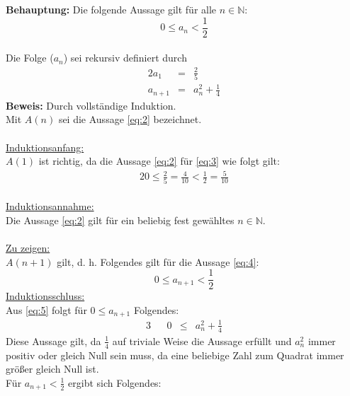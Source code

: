\documentclass[10pt,a4paper,oneside,ngerman,numbers=noenddot]{scrartcl}
\begin{document}
\section{} %
\textbf{Behauptung:} Die folgende Aussage gilt für alle $n \in \mathbb{N}$:\\
\begin{equation*}
0 \leq a_{n} < \frac{1}{2} \label{eq:2}\tag{2}
\end{equation*}\\
Die Folge ($a_{n}$) sei rekursiv definiert durch \\
\begin{alignat*}{2}
a_{1} &=& \frac{2}{5} \label{eq:3}\tag{3}\\
a_{n+1} &=& a_{n}^{2} + \frac{1}{4} \label{eq:4}\tag{4}
\end{alignat*} 
\textbf{Beweis:} Durch vollständige Induktion.\\
Mit $A(n)$ sei die Aussage \eqref{eq:2} bezeichnet.\\\\
\underline{Induktionsanfang:} \\
$A(1)$ ist richtig, da die Aussage \eqref{eq:2} für \eqref{eq:3} wie folgt gilt: 
\begin{alignat*}{2}
0 \leq \frac{2}{5} = \frac{4}{10} < \frac{1}{2} = \frac{5}{10} 
\end{alignat*}\\
\underline{Induktionsannahme:}\\
Die Aussage \eqref{eq:2} gilt für ein beliebig fest gewähltes $n \in \mathbb{N}$.\\\\
\underline{Zu zeigen:}\\
$A(n+1)$ gilt, d. h. Folgendes gilt für die Aussage \eqref{eq:4}:\\
\begin{equation*}
0 \leq a_{n+1} < \frac{1}{2} \label{eq:5}\tag{5}
\end{equation*}
\underline{Induktionsschluss:}\\
Aus \eqref{eq:5} folgt für $0 \leq a_{n+1}$ Folgendes:\\
\begin{alignat*}{3}
&& 0 &\leq & a_{n}^{2} + \frac{1}{4}
\end{alignat*}
Diese Aussage gilt, da $\frac{1}{4}$ auf triviale Weise die Aussage erfüllt und $a_{n}^{2}$ immer positiv oder gleich Null sein muss, da eine beliebige Zahl zum Quadrat immer größer gleich Null ist.\\
Für $a_{n+1} < \frac{1}{2}$ ergibt sich Folgendes:\\
\end{document}
